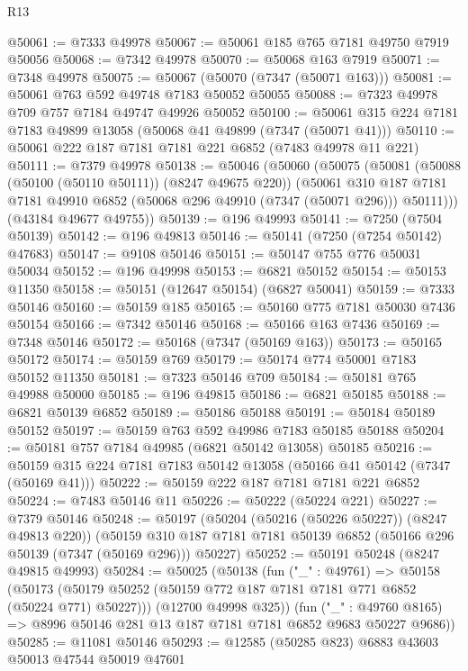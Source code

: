 \begin{lexlean}{R13}
\begin{coremodule}
@50061 := @7333 @49978
@50067 := @50061 @185 @765 @7181 @49750 @7919 @50056
@50068 := @7342 @49978
@50070 := @50068 @163 @7919
@50071 := @7348 @49978
@50075 := @50067 (@50070 (@7347 (@50071 @163)))
@50081 := @50061 @763 @592 @49748 @7183 @50052 @50055
@50088 := @7323 @49978 @709 @757 @7184 @49747 @49926 @50052
@50100 := @50061 @315 @224 @7181 @7183 @49899 @13058 (@50068 @41 @49899 (@7347 (@50071 @41)))
@50110 := @50061 @222 @187 @7181 @7181 @221 @6852 (@7483 @49978 @11 @221)
@50111 := @7379 @49978
@50138 := @50046
    (@50060
      (@50075
        (@50081
          (@50088 (@50100 (@50110 @50111)) (@8247 @49675 @220))
          (@50061
            @310
            @187
            @7181
            @7181
            @49910
            @6852
            (@50068 @296 @49910 (@7347 (@50071 @296)))
            @50111)))
      (@43184 @49677 @49755))
@50139 := @196 @49993
@50141 := @7250 (@7504 @50139)
@50142 := @196 @49813
@50146 := @50141 (@7250 (@7254 @50142) @47683)
@50147 := @9108 @50146
@50151 := @50147 @755 @776 @50031 @50034
@50152 := @196 @49998
@50153 := @6821 @50152
@50154 := @50153 @11350
@50158 := @50151 (@12647 @50154) (@6827 @50041)
@50159 := @7333 @50146
@50160 := @50159 @185
@50165 := @50160 @775 @7181 @50030 @7436 @50154
@50166 := @7342 @50146
@50168 := @50166 @163 @7436
@50169 := @7348 @50146
@50172 := @50168 (@7347 (@50169 @163))
@50173 := @50165 @50172
@50174 := @50159 @769
@50179 := @50174 @774 @50001 @7183 @50152 @11350
@50181 := @7323 @50146 @709
@50184 := @50181 @765 @49988 @50000
@50185 := @196 @49815
@50186 := @6821 @50185
@50188 := @6821 @50139 @6852
@50189 := @50186 @50188
@50191 := @50184 @50189 @50152
@50197 := @50159 @763 @592 @49986 @7183 @50185 @50188
@50204 := @50181 @757 @7184 @49985 (@6821 @50142 @13058) @50185
@50216 := @50159 @315 @224 @7181 @7183 @50142 @13058 (@50166 @41 @50142 (@7347 (@50169 @41)))
@50222 := @50159 @222 @187 @7181 @7181 @221 @6852
@50224 := @7483 @50146 @11
@50226 := @50222 (@50224 @221)
@50227 := @7379 @50146
@50248 := @50197
    (@50204 (@50216 (@50226 @50227)) (@8247 @49813 @220))
    (@50159 @310 @187 @7181 @7181 @50139 @6852 (@50166 @296 @50139 (@7347 (@50169 @296))) @50227)
@50252 := @50191 @50248 (@8247 @49815 @49993)
@50284 := @50025
    (@50138
      (fun ("_" : @49761) =>
      @50158
        (@50173 (@50179 @50252 (@50159 @772 @187 @7181 @7181 @771 @6852 (@50224 @771) @50227)))
        (@12700 @49998 @325))
      (fun ("_" : @49760 @8165) => @8996 @50146 @281 @13 @187 @7181 @7181 @6852 @9683 @50227 @9686))
@50285 := @11081 @50146
@50293 := @12585 (@50285 @823) @6883 @43603 @50013 @47544 @50019 @47601

\end{coremodule}
\end{lexlean}

